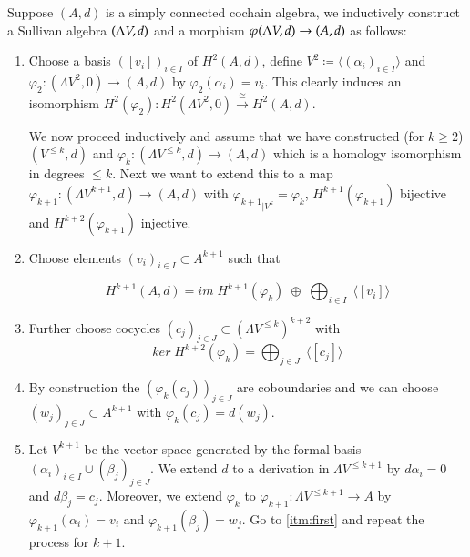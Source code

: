 \begin{Algorithm}
\label{alg:ConstructionOfMinimalSullivanAlgebra}
 Suppose $(A,d)$ is a simply connected cochain algebra, we inductively construct a Sullivan algebra $(\Lambda V,d)$ and a morphism
 $\varphi (\Lambda V,d) \to (A,d)$ as follows:
 
 \begin{enumerate}
  \item \label{itm:FirstAlgorithmStep} Choose a basis $([v_i])_{i \in I}$ of $H^2(A,d)$, define $V^2 \coloneqq \langle (\alpha_i)_{i \in I} \rangle$ and
  $\varphi_2 \colon (\Lambda V^2,0) \to (A,d)$ by $\varphi_2(\alpha_i) = v_i$. This clearly induces an isomorphism 
  $H^2(\varphi_2) \colon H^2(\Lambda V^2, 0) \overset{\cong}{\to} H^2(A,d)$.
   
   We now proceed inductively and assume that we have constructed (for $k \geq 2$) $(V^{\leq k}, d)$ and
   ${\varphi_k \colon (\Lambda V^{\leq k}, d) \to (A,d)}$ which is a homology isomorphism in degrees $\leq k$.
   Next we want to extend this to a map $\varphi_{k+1} \colon (\Lambda V^{k+1}, d) \to (A,d)$ with 
   ${\varphi_{k+1}}_{|V^k} = \varphi_k$, $H^{k+1}(\varphi_{k+1})$ bijective and $H^{k + 2}(\varphi_{k+1})$ injective.
   
   \item \label{itm:first} Choose elements $(v_i)_{i \in I} \subset A^{k+1}$ such that
   
   $$H^{k+1}(A,d) = im \; H^{k+1}(\varphi_k) \; \oplus \; \bigoplus_{i \in I} \; \langle [v_i] \rangle $$
   
   \item \label{itm:third} Further choose cocycles $(c_j)_{j \in J} \subset (\Lambda V^{\leq k})^{k+2}$ with
   $$ ker \; H^{k+2}(\varphi_k) = \bigoplus_{j \in J} \; \langle [c_j] \rangle$$
   
   \item By construction the $(\varphi_k(c_j))_{j \in J}$ are coboundaries and we can choose 
   $(w_j)_{j \in J} \subset A^{k+1}$ with $\varphi_k (c_j) = d(w_j)$.
   \item \label{itm:second} Let 
   $V^{k+1}$ be the vector space generated by the formal basis $(\alpha_i)_{i \in I} \cup (\beta_j)_{j \in J}$. We extend $d$
   to a derivation in $\Lambda V^{\leq k+1}$ by $d \alpha_i = 0$ and $d \beta_j = c_j$. Moreover, we extend $\varphi_k$
   to $\varphi_{k+1} \colon \Lambda V^{ \leq k+1} \to A$ by $\varphi_{k+1} (\alpha_i) = v_i$ and 
   $\varphi_{k+1} (\beta_j) = w_j$. Go to \ref{itm:first} and repeat the process for $k+1$.
 \end{enumerate}

\end{Algorithm}
